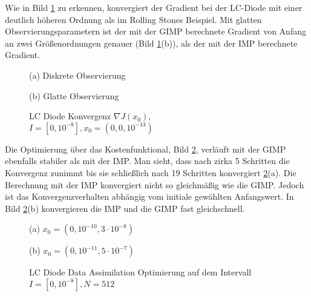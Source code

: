 Wie in Bild \ref{fig:lcAdjointConvergence} zu erkennen, konvergiert der Gradient bei der LC-Diode mit einer deutlich höheren Ordnung als im Rolling Stones Beispiel. Mit glatten Observierungsparametern ist der mit der GIMP berechnete Gradient von Anfang an zwei Größenordnungen genauer (Bild \ref{fig:lcAdjointConvergence}(b)), als der mit der IMP berechnete Gradient. 
\begin{figure}[H]
\footnotesize 
\centering
\begin{minipage}[b]{0.49\linewidth}

\caption*{(a) Diskrete Observierung}
\end{minipage}
\begin{minipage}[b]{0.49\linewidth}

\caption*{(b) Glatte Observierung}
\end{minipage}
\caption{LC Diode Konvergenz $\nabla J(x_0)$, \\$I=[0,10^{-8}],x_0=(0,0,10^{-13})$}
\label{fig:lcAdjointConvergence}
\end{figure}

Die Optimierung über das Kostenfunktional, Bild \ref{fig:lcOpt}, verläuft mit der GIMP ebenfalls stabiler als mit der IMP. Man sieht, dass nach zirka 5 Schritten die Konvergenz zunimmt bis sie schließlich nach 19 Schritten konvergiert \ref{fig:lcOpt}(a). Die Berechnung mit der IMP konvergiert nicht so gleichmäßig wie die GIMP. Jedoch ist das Konvergenzverhalten abhängig vom  initiale gewählten Anfangswert. In Bild \ref{fig:lcOpt}(b) konvergieren die IMP und die GIMP fast gleichschnell.

\begin{figure}[H]
\footnotesize
\centering
\begin{minipage}[b]{0.49\linewidth}

\caption*{(a) $x_0=(0,10^{-10},3\cdot 10^{-8})$}
\end{minipage}
\begin{minipage}[b]{0.49\linewidth}

\caption*{(b) $x_0=(0,10^{-11},5\cdot 10^{-7})$}
\end{minipage}
\caption{LC Diode Data Assimilation Optimierung auf dem Intervall $I = [0,10^{-8}], N=512$}
\label{fig:lcOpt}
\end{figure}


